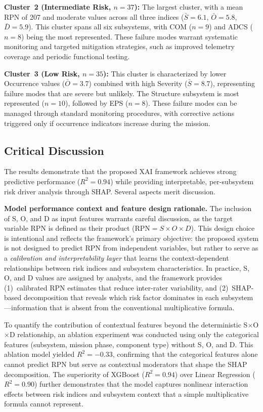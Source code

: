 \textbf{Cluster~2 (Intermediate Risk, $n=37$):} The largest cluster, with a mean RPN of 207 and moderate values across all three indices ($\bar{S} = 6.1$, $\bar{O} = 5.8$, $\bar{D} = 5.9$). This cluster spans all six subsystems, with COM ($n=9$) and ADCS ($n=8$) being the most represented. These failure modes warrant systematic monitoring and targeted mitigation strategies, such as improved telemetry coverage and periodic functional testing.

\textbf{Cluster~3 (Low Risk, $n=35$):} This cluster is characterized by lower Occurrence values ($\bar{O} = 3.7$) combined with high Severity ($\bar{S} = 8.7$), representing failure modes that are severe but unlikely. The Structure subsystem is most represented ($n=10$), followed by EPS ($n=8$). These failure modes can be managed through standard monitoring procedures, with corrective actions triggered only if occurrence indicators increase during the mission.

\subsection{Critical Discussion}
\label{subsec:discussion}

The results demonstrate that the proposed XAI framework achieves strong predictive performance ($R^2 = 0.94$) while providing interpretable, per-subsystem risk driver analysis through SHAP. Several aspects merit discussion.

\textbf{Model performance context and feature design rationale.} The inclusion of S, O, and D as input features warrants careful discussion, as the target variable RPN is defined as their product ($\text{RPN} = S \times O \times D$). This design choice is intentional and reflects the framework's primary objective: the proposed system is not designed to predict RPN from independent variables, but rather to serve as a \emph{calibration and interpretability layer} that learns the context-dependent relationships between risk indices and subsystem characteristics. In practice, S, O, and D values are assigned by analysts, and the framework provides (1)~calibrated RPN estimates that reduce inter-rater variability, and (2)~SHAP-based decomposition that reveals which risk factor dominates in each subsystem---information that is absent from the conventional multiplicative formula.

To quantify the contribution of contextual features beyond the deterministic S$\times$O$\times$D relationship, an ablation experiment was conducted using only the categorical features (subsystem, mission phase, component type) without S, O, and D. This ablation model yielded $R^2 = -0.33$, confirming that the categorical features alone cannot predict RPN but serve as contextual moderators that shape the SHAP decomposition. The superiority of XGBoost ($R^2 = 0.94$) over Linear Regression ($R^2 = 0.90$) further demonstrates that the model captures nonlinear interaction effects between risk indices and subsystem context that a simple multiplicative formula cannot represent.

